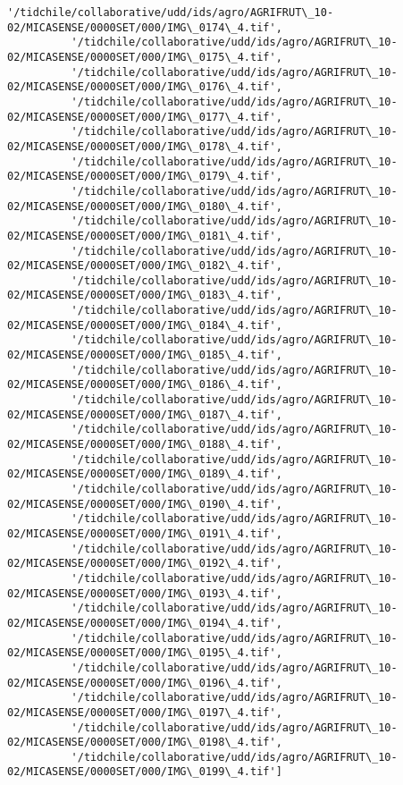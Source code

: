\documentclass[11pt]{article}
\begin{document}
\begin{Verbatim}[commandchars=\\\{\}]
          '/tidchile/collaborative/udd/ids/agro/AGRIFRUT\_10-02/MICASENSE/0000SET/000/IMG\_0174\_4.tif',
          '/tidchile/collaborative/udd/ids/agro/AGRIFRUT\_10-02/MICASENSE/0000SET/000/IMG\_0175\_4.tif',
          '/tidchile/collaborative/udd/ids/agro/AGRIFRUT\_10-02/MICASENSE/0000SET/000/IMG\_0176\_4.tif',
          '/tidchile/collaborative/udd/ids/agro/AGRIFRUT\_10-02/MICASENSE/0000SET/000/IMG\_0177\_4.tif',
          '/tidchile/collaborative/udd/ids/agro/AGRIFRUT\_10-02/MICASENSE/0000SET/000/IMG\_0178\_4.tif',
          '/tidchile/collaborative/udd/ids/agro/AGRIFRUT\_10-02/MICASENSE/0000SET/000/IMG\_0179\_4.tif',
          '/tidchile/collaborative/udd/ids/agro/AGRIFRUT\_10-02/MICASENSE/0000SET/000/IMG\_0180\_4.tif',
          '/tidchile/collaborative/udd/ids/agro/AGRIFRUT\_10-02/MICASENSE/0000SET/000/IMG\_0181\_4.tif',
          '/tidchile/collaborative/udd/ids/agro/AGRIFRUT\_10-02/MICASENSE/0000SET/000/IMG\_0182\_4.tif',
          '/tidchile/collaborative/udd/ids/agro/AGRIFRUT\_10-02/MICASENSE/0000SET/000/IMG\_0183\_4.tif',
          '/tidchile/collaborative/udd/ids/agro/AGRIFRUT\_10-02/MICASENSE/0000SET/000/IMG\_0184\_4.tif',
          '/tidchile/collaborative/udd/ids/agro/AGRIFRUT\_10-02/MICASENSE/0000SET/000/IMG\_0185\_4.tif',
          '/tidchile/collaborative/udd/ids/agro/AGRIFRUT\_10-02/MICASENSE/0000SET/000/IMG\_0186\_4.tif',
          '/tidchile/collaborative/udd/ids/agro/AGRIFRUT\_10-02/MICASENSE/0000SET/000/IMG\_0187\_4.tif',
          '/tidchile/collaborative/udd/ids/agro/AGRIFRUT\_10-02/MICASENSE/0000SET/000/IMG\_0188\_4.tif',
          '/tidchile/collaborative/udd/ids/agro/AGRIFRUT\_10-02/MICASENSE/0000SET/000/IMG\_0189\_4.tif',
          '/tidchile/collaborative/udd/ids/agro/AGRIFRUT\_10-02/MICASENSE/0000SET/000/IMG\_0190\_4.tif',
          '/tidchile/collaborative/udd/ids/agro/AGRIFRUT\_10-02/MICASENSE/0000SET/000/IMG\_0191\_4.tif',
          '/tidchile/collaborative/udd/ids/agro/AGRIFRUT\_10-02/MICASENSE/0000SET/000/IMG\_0192\_4.tif',
          '/tidchile/collaborative/udd/ids/agro/AGRIFRUT\_10-02/MICASENSE/0000SET/000/IMG\_0193\_4.tif',
          '/tidchile/collaborative/udd/ids/agro/AGRIFRUT\_10-02/MICASENSE/0000SET/000/IMG\_0194\_4.tif',
          '/tidchile/collaborative/udd/ids/agro/AGRIFRUT\_10-02/MICASENSE/0000SET/000/IMG\_0195\_4.tif',
          '/tidchile/collaborative/udd/ids/agro/AGRIFRUT\_10-02/MICASENSE/0000SET/000/IMG\_0196\_4.tif',
          '/tidchile/collaborative/udd/ids/agro/AGRIFRUT\_10-02/MICASENSE/0000SET/000/IMG\_0197\_4.tif',
          '/tidchile/collaborative/udd/ids/agro/AGRIFRUT\_10-02/MICASENSE/0000SET/000/IMG\_0198\_4.tif',
          '/tidchile/collaborative/udd/ids/agro/AGRIFRUT\_10-02/MICASENSE/0000SET/000/IMG\_0199\_4.tif']
\end{Verbatim}
            
\end{document}
